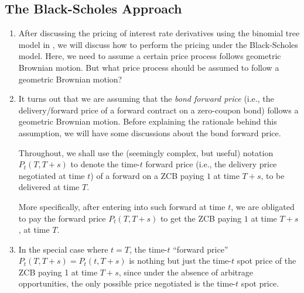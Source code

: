 \subsection{The Black-Scholes Approach}
\begin{enumerate}
\item After discussing the pricing of interest rate derivatives using the
binomial tree model in , we will discuss
how to perform the pricing under the Black-Scholes model. Here, we need to
assume a certain price process follows geometric Brownian motion. But what
price process should be assumed to follow a geometric Brownian motion?

\item It turns out that we are assuming that the \emph{bond forward price}
(i.e., the delivery/forward price of a forward contract on a zero-coupon bond)
follows a geometric Brownian motion. Before explaining the rationale behind
this assumption, we will have some discussions about the bond forward price.

Throughout, we shall use the (seemingly complex, but useful) notation
\(P_t(T,T+s)\) to denote the time-\(t\) forward price (i.e., the delivery price
negotiated at time \(t\)) of a forward on a ZCB paying \(1\) at time \(T+s\),
to be delivered at time \(T\).
\begin{center}
\end{center}
More specifically, after entering into such forward at time \(t\), we are
obligated to pay the forward price \(P_t(T,T+s)\) to get the ZCB paying \(1\)
at time \(T+s\), at time \(T\).

\item In the special case where \(t=T\), the time-\(t\) ``forward price''
\(P_t(T,T+s)=P_t(t,T+s)\) is nothing but just the time-\(t\) spot price of the
ZCB paying 1 at time \(T+s\), since under the absence of arbitrage
opportunities, the only possible price negotiated is the time-\(t\) spot
price.


\end{enumerate}

